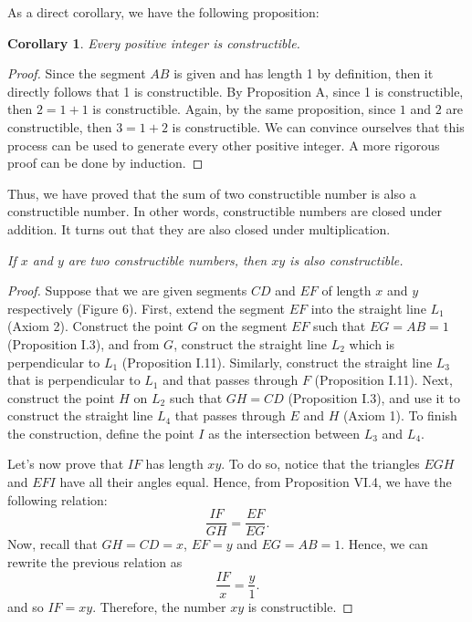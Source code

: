 \documentclass{article}
\theoremstyle{plain}
\newtheorem*{corollary}{Corollary}
\theoremstyle{definition}
\newenvironment{customthm}[1]
  {\renewcommand\theinnercustomthm{#1}\innercustomthm}
  {\endinnercustomthm}
\begin{document}
\noindent As a direct corollary, we have the following proposition:

\begin{corollary}
    Every positive integer is constructible.
\end{corollary}

\begin{proof}
    Since the segment $AB$ is given and has length 1 by definition, then it directly follows that 1 is constructible. By Proposition A, since 1 is constructible, then $2 = 1+1$ is constructible. Again, by the same proposition, since $1$ and $2$ are constructible, then $3 = 1 + 2$ is constructible. We can convince ourselves that this process can be used to generate every other positive integer. A more rigorous proof can be done by induction.
\end{proof}

Thus, we have proved that the sum of two constructible number is also a constructible number. In other words, constructible numbers are closed under addition. It turns out that they are also closed under multiplication.

\begin{customthm}{B}\label{B}
    \textit{If $x$ and $y$ are two constructible numbers, then $xy$ is also constructible.}
\end{customthm}

\begin{proof}
    Suppose that we are given segments $CD$ and $EF$ of length $x$ and $y$ respectively (Figure 6). First, extend the segment $EF$ into the straight line $L_1$ (Axiom 2). Construct the point $G$ on the segment $EF$ such that $EG = AB = 1$ (Proposition I.3), and from $G$, construct the straight line $L_2$ which is perpendicular to $L_1$ (Proposition I.11). Similarly, construct the straight line $L_3$ that is perpendicular to $L_1$ and that passes through $F$ (Proposition I.11). Next, construct the point $H$ on $L_2$ such that $GH = CD$ (Proposition I.3), and use it to construct the straight line $L_4$ that passes through $E$ and $H$ (Axiom 1). To finish the construction, define the point $I$ as the intersection between $L_3$ and $L_4$. 

    Let's now prove that $IF$ has length $xy$. To do so, notice that the triangles $EGH$ and $EFI$ have all their angles equal. Hence, from Proposition VI.4, we have the following relation:
    $$\frac{IF}{GH} = \frac{EF}{EG}.$$
    Now, recall that $GH = CD = x$, $EF = y$ and $EG = AB = 1$. Hence, we can rewrite the previous relation as
    $$\frac{IF}{x} = \frac{y}{1}.$$
    and so $IF = xy$. Therefore, the number $xy$ is constructible.
\end{proof}
\end{document}
